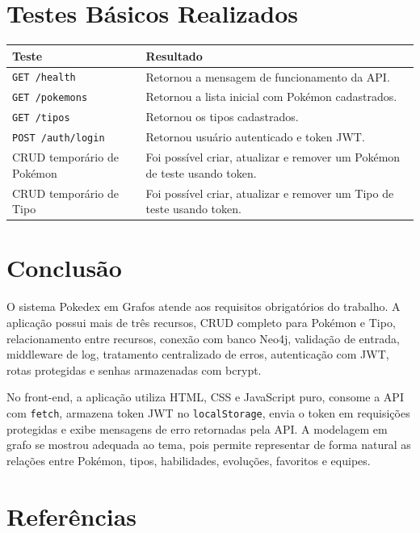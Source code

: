 \documentclass[12pt,a4paper]{article}
\begin{document}
\section{Testes Básicos Realizados}

\begin{table}[H]
\centering
\begin{tabular}{p{5cm}p{8.5cm}}
\toprule
\textbf{Teste} & \textbf{Resultado}\\
\midrule
\texttt{GET /health} & Retornou a mensagem de funcionamento da API.\\
\texttt{GET /pokemons} & Retornou a lista inicial com Pokémon cadastrados.\\
\texttt{GET /tipos} & Retornou os tipos cadastrados.\\
\texttt{POST /auth/login} & Retornou usuário autenticado e token JWT.\\
CRUD temporário de Pokémon & Foi possível criar, atualizar e remover um Pokémon de teste usando token.\\
CRUD temporário de Tipo & Foi possível criar, atualizar e remover um Tipo de teste usando token.\\
\bottomrule
\end{tabular}
\end{table}

\section{Conclusão}

O sistema Pokedex em Grafos atende aos requisitos obrigatórios do trabalho. A aplicação possui mais de três recursos, CRUD completo para Pokémon e Tipo, relacionamento entre recursos, conexão com banco Neo4j, validação de entrada, middleware de log, tratamento centralizado de erros, autenticação com JWT, rotas protegidas e senhas armazenadas com bcrypt.

No front-end, a aplicação utiliza HTML, CSS e JavaScript puro, consome a API com \texttt{fetch}, armazena token JWT no \texttt{localStorage}, envia o token em requisições protegidas e exibe mensagens de erro retornadas pela API. A modelagem em grafo se mostrou adequada ao tema, pois permite representar de forma natural as relações entre Pokémon, tipos, habilidades, evoluções, favoritos e equipes.

\section*{Referências}
\end{document}
